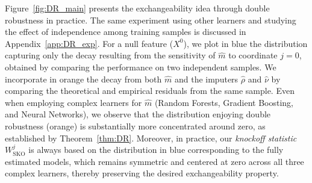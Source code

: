 \documentclass{article}
\theoremstyle{plain}
\theoremstyle{definition}
\theoremstyle{remark}
\begin{document}
Figure~\ref{fig:DR_main} presents the exchangeability idea through double robustness in practice. The same experiment using other learners and studying the effect of independence among training samples is discussed in Appendix~\ref{app:DR_exp}.
%
For a null feature ($X^0$), we plot in blue the distribution capturing only the decay resulting from the sensitivity of $\widehat{m}$ to coordinate $j=0$, obtained by comparing the performance on two independent samples. 
%
We incorporate in orange the decay from both $\widehat{m}$ and the imputers $\widehat{\rho}$ and $\widehat{\nu}$ by comparing the theoretical and empirical residuals from the same sample.
%
Even when employing complex learners for $\widehat{m}$ (Random Forests, Gradient Boosting, and Neural Networks), we observe that the distribution enjoying double robustness (orange) is substantially more concentrated around zero, as established by Theorem~\ref{thm:DR}. 
%
Moreover, in practice, our \emph{knockoff statistic} $W^j_\mathrm{SKO}$ is always based on the distribution  in blue corresponding to the fully estimated models, which remains symmetric and centered at zero across all three complex learners, thereby preserving the desired exchangeability property.
%
%
%
%
\end{document}
